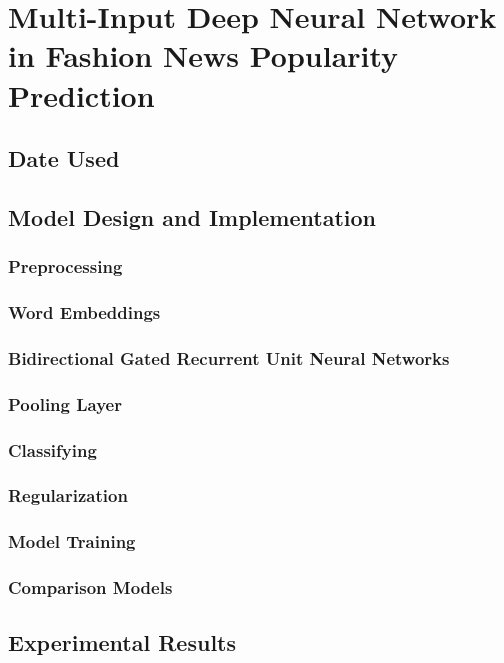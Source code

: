 \chapter{Multi-Input Deep Neural Network in Fashion News Popularity Prediction}
\label{exp2}
\section{Date Used}
\section{Model Design and Implementation}
\subsection{Preprocessing}
\subsection{Word Embeddings}
\subsection{Bidirectional Gated Recurrent Unit Neural Networks}
\subsection{Pooling Layer}
\subsection{Classifying}
\subsection{Regularization}
\subsection{Model Training}
\subsection{Comparison Models}

\section{Experimental Results}
